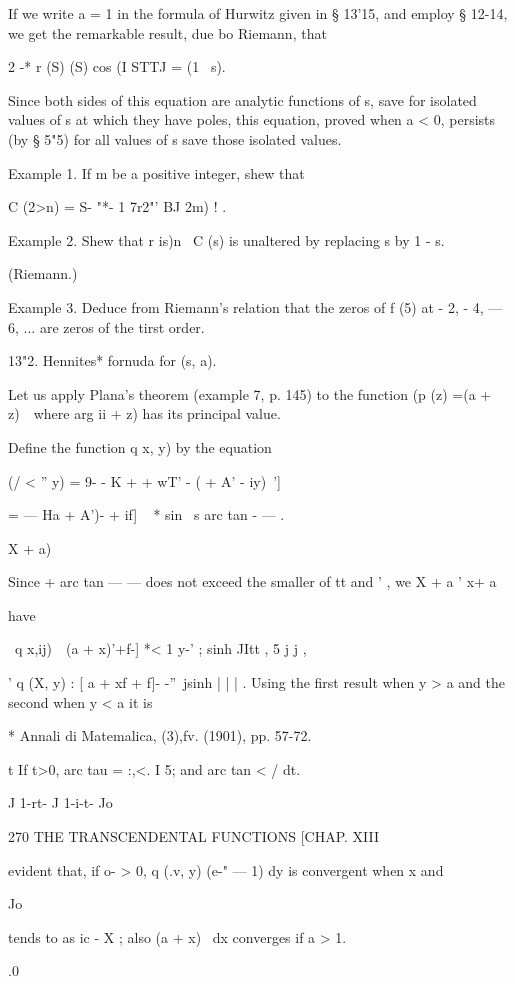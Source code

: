 If we write a = 1 in the formula of Hurwitz given in § 13'15, and
employ § 12-14, we get the remarkable result, due bo Riemann, that

2 -* r (S) (S) cos (I STTJ = (1 \ s).

Since both sides of this equation are analytic functions of s, save
for isolated values of s at which they have poles, this equation,
proved when a < 0, persists (by § 5"5) for all values of s save those
isolated values.

Example 1. If m be a positive integer, shew that

C (2>n) = S- "*- 1 7r2"' BJ 2m) ! .

Example 2. Shew that r is)n~ C (s) is unaltered by replacing s by 1 -
s.

(Riemann.)

Example 3. Deduce from Riemann's relation that the zeros of f (5) at -
2, - 4, — 6, ... are zeros of the tirst order.

13"2. Hennites* fornuda for (s, a).

Let us apply Plana's theorem (example 7, p. 145) to the function (p
(z) =(a + z)~\ where arg ii + z) has its principal value.

Define the function q x, y) by the equation

(/ < '' y) = 9- - K + + wT' - ( + A' - iy)~']

= — Ha + A')- + if] ~ * sin \ s arc tan - — .

  X + a)

Since + arc tan — — does not exceed the smaller of tt and ' , we X + a
' x+ a

have

\ q x,ij)\ \ (a + x)'+f-] *< 1 y-' ; sinh JItt , 5 j j ,

' q (X, y) : [ a + xf + f]- -''\ jsinh | | | . Using the first result
when y > a and the second when y < a it is

* Annali di Matemalica, (3),fv. (1901), pp. 57-72.

t If t>0, arc tau = :,<. I 5; and arc tan < / dt.

J 1-rt- J 1-i-t- Jo

270 THE TRANSCENDENTAL FUNCTIONS [CHAP. XIII

evident that, if o- > 0, q (.v, y) (e-" — 1) dy is convergent when x
and

Jo

tends to as ic - X ; also (a + x)~ dx converges if a > 1.

.0

